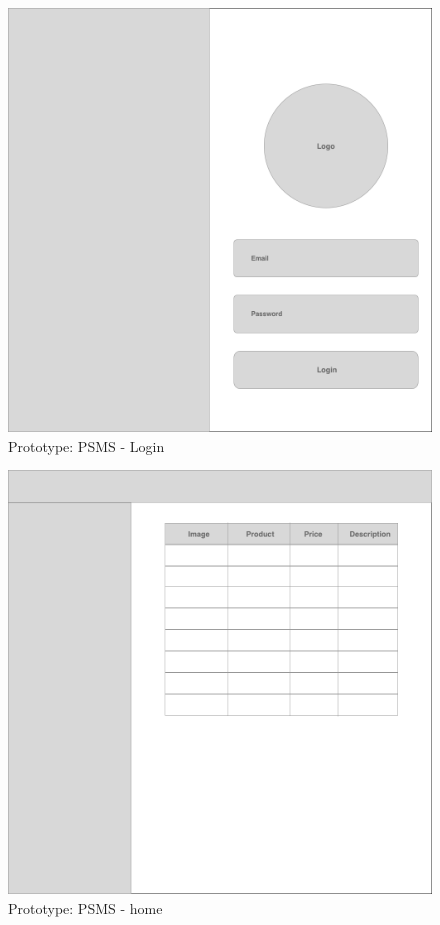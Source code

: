 \begin{figure}[ht]
    \centering
    \includegraphics[scale=0.30]{../images/prototype-psms-login.png}
    \caption{Prototype: PSMS - Login}
    \label{fig:psms-prototype-login}
\end{figure}

\begin{figure}[ht]
    \centering
    \includegraphics[scale=0.30]{../images/prototype-psms-home.png}
    \caption{Prototype: PSMS - home}
    \label{fig:psms-prototype-home}
\end{figure}

